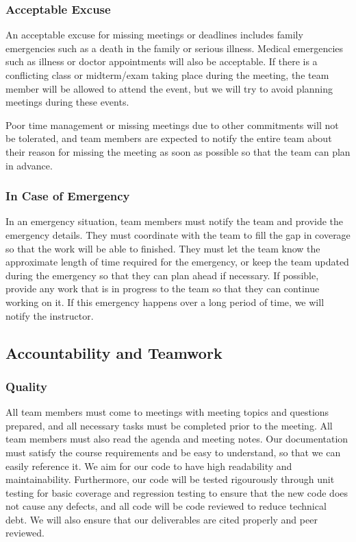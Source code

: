 \documentclass{article}
\begin{document}
\subsubsection*{Acceptable Excuse}

An acceptable excuse for missing meetings or deadlines includes family emergencies such as a death in the family or serious illness. Medical emergencies such as illness or doctor appointments will also be acceptable. 
If there is a conflicting class or midterm/exam taking place during the meeting, the team member will be allowed to attend the event, but we will try to avoid planning meetings during these events. 

Poor time management or missing meetings due to other commitments will not be tolerated, and team members are expected to notify the entire team about their reason for missing the meeting as soon as possible so that the team can plan in advance.

\subsubsection*{In Case of Emergency}

In an emergency situation, team members must notify the team and provide the emergency details. They must coordinate with the team to fill the gap in coverage so that the work will be able to finished.
They must let the team know the approximate length of time required for the emergency, or keep the team updated during the emergency so that they can plan ahead if necessary. If possible, provide any work 
that is in progress to the team so that they can continue working on it. If this emergency happens over a long period of time, we will notify the instructor.

\subsection*{Accountability and Teamwork}

\subsubsection*{Quality} 

All team members must come to meetings with meeting topics and questions prepared, and all necessary tasks must be completed prior to the meeting. All team members must also read the agenda and meeting notes. 
Our documentation must satisfy the course requirements and be easy to understand, so that we can easily reference it. We aim for our code to have high readability and maintainability. Furthermore, our code 
will be tested rigourously through unit testing for basic coverage and regression testing to ensure that the new code does not cause any defects, and all code will be code reviewed to reduce technical debt.
We will also ensure that our deliverables are cited properly and peer reviewed.
\end{document}

